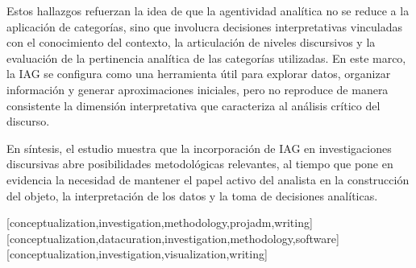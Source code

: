 \documentclass[spanish]{textolivre}
\begin{document}
Estos hallazgos refuerzan la idea de que la agentividad analítica no se reduce a la aplicación de categorías, sino que involucra decisiones interpretativas vinculadas con el conocimiento del contexto, la articulación de niveles discursivos y la evaluación de la pertinencia analítica de las categorías utilizadas. En este marco, la IAG se configura como una herramienta útil para explorar datos, organizar información y generar aproximaciones iniciales, pero no reproduce de manera consistente la dimensión interpretativa que caracteriza al análisis crítico del discurso.

En síntesis, el estudio muestra que la incorporación de IAG en investigaciones discursivas abre posibilidades metodológicas relevantes, al tiempo que pone en evidencia la necesidad de mantener el papel activo del analista en la construcción del objeto, la interpretación de los datos y la toma de decisiones analíticas.


\printbibliography\label{sec-bib}


\begin{contributors}
[conceptualization,investigation,methodology,projadm,writing]
[conceptualization,datacuration,investigation,methodology,software]
[conceptualization,investigation,visualization,writing]
\end{contributors}


\begin{dataavailability}
\end{dataavailability}
\end{document}
